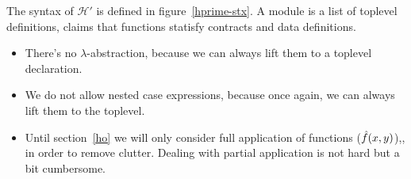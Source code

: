 \documentclass[preprint]{sigplanconf}
\begin{document}
The syntax of $\mathcal{H}'$ is defined in figure~\ref{hprime-stx}. A module
is a list of toplevel definitions, claims that functions statisfy
contracts and data definitions.

\begin{itemize}
\item There's no $\lambda$-abstraction, because we can always lift
  them to a toplevel declaration.
\item We do not allow nested case expressions, because once again, we
  can always lift them to the toplevel.
\item Until section~\ref{ho} we will only consider full application of
  functions ($\hat{f}(x,y)$),, in order to remove clutter. Dealing with
  partial application is not hard but a bit cumbersome.
\end{itemize}
\end{document}
